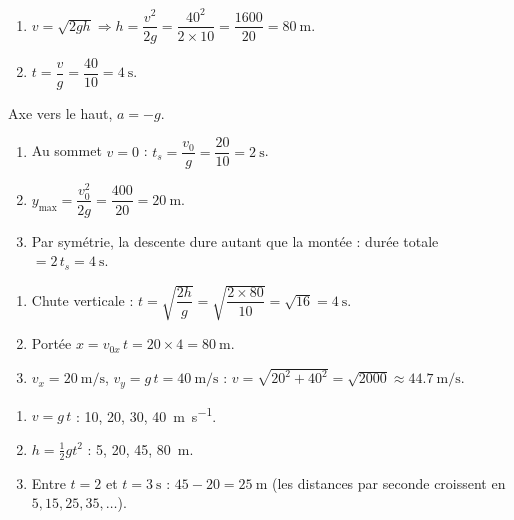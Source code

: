\documentclass[11pt,a4paper]{article}
\begin{document}

\begin{corrige}
\begin{enumerate}[label=\alph*)]
  \item $v=\sqrt{2gh}\Rightarrow h=\dfrac{v^2}{2g}=\dfrac{40^2}{2\times10}=\dfrac{1600}{20}=\qty{80}{\metre}$.
  \item $t=\dfrac{v}{g}=\dfrac{40}{10}=\qty{4}{\second}$.
\end{enumerate}
\end{corrige}

\begin{corrige}
Axe vers le haut, $a=-g$.
\begin{enumerate}[label=\alph*)]
  \item Au sommet $v=0$ : $t_s=\dfrac{v_0}{g}=\dfrac{20}{10}=\qty{2}{\second}$.
  \item $y_{\max}=\dfrac{v_0^2}{2g}=\dfrac{400}{20}=\qty{20}{\metre}$.
  \item Par symétrie, la descente dure autant que la montée : durée totale $=2\,t_s=\qty{4}{\second}$.
\end{enumerate}
\end{corrige}

\begin{corrige}
\begin{enumerate}[label=\alph*)]
  \item Chute verticale : $t=\sqrt{\dfrac{2h}{g}}=\sqrt{\dfrac{2\times80}{10}}=\sqrt{16}=\qty{4}{\second}$.
  \item Portée $x=v_{0x}\,t=20\times4=\qty{80}{\metre}$.
  \item $v_x=\qty{20}{\metre\per\second}$, $v_y=g\,t=40\ \si{\metre\per\second}$ : $v=\sqrt{20^2+40^2}=\sqrt{2000}\approx\qty{44,7}{\metre\per\second}$.
\end{enumerate}
\end{corrige}

\begin{corrige}
\begin{enumerate}[label=\alph*)]
  \item $v=g\,t$ : \quad \qty{10}{}, \qty{20}{}, \qty{30}{}, \qty{40}{\metre\per\second}.
  \item $h=\tfrac12 g t^2$ : \quad \qty{5}{}, \qty{20}{}, \qty{45}{}, \qty{80}{\metre}.
  \item Entre $t=2$ et $t=\qty{3}{\second}$ : $45-20=\qty{25}{\metre}$ (les distances par seconde croissent en $5,15,25,35,\dots$).
\end{enumerate}
\end{corrige}
\end{document}
